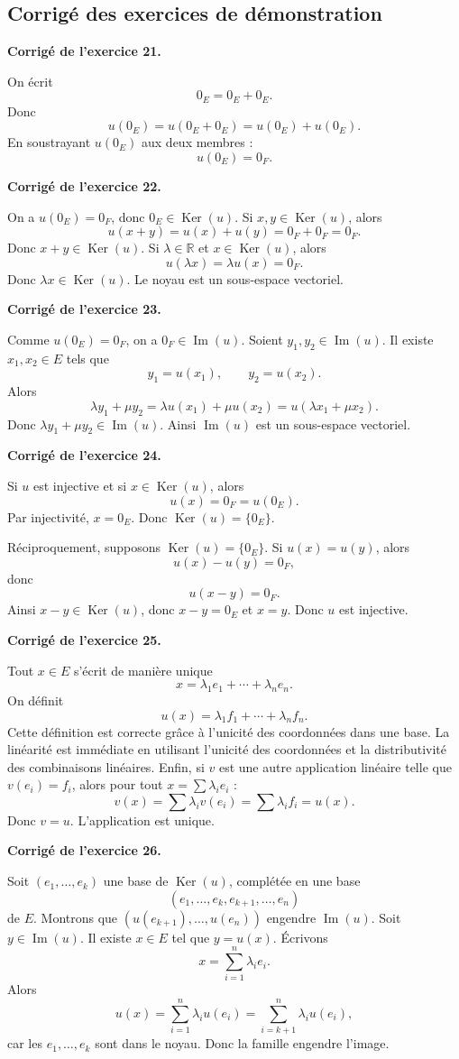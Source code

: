 \documentclass[11pt,a4paper]{article}
\newcommand{\corr}[1]{
    \vspace{0.35cm}
    \noindent\textbf{\textcolor{blue!60!black}{Corrigé de l'exercice #1.}}
    \par
}
\newcommand{\Ker}{\operatorname{Ker}}
\newcommand{\Img}{\operatorname{Im}}
\begin{document}
\subsection{Corrigé des exercices de démonstration}

\corr{21}
On écrit
\[
0_E=0_E+0_E.
\]
Donc
\[
u(0_E)=u(0_E+0_E)=u(0_E)+u(0_E).
\]
En soustrayant $u(0_E)$ aux deux membres :
\[
u(0_E)=0_F.
\]

\corr{22}
On a $u(0_E)=0_F$, donc $0_E\in\Ker(u)$.
Si $x,y\in\Ker(u)$, alors
\[
u(x+y)=u(x)+u(y)=0_F+0_F=0_F.
\]
Donc $x+y\in\Ker(u)$.
Si $\lambda\in\mathbb{R}$ et $x\in\Ker(u)$, alors
\[
u(\lambda x)=\lambda u(x)=0_F.
\]
Donc $\lambda x\in\Ker(u)$. Le noyau est un sous-espace vectoriel.

\corr{23}
Comme $u(0_E)=0_F$, on a $0_F\in\Img(u)$.
Soient $y_1,y_2\in\Img(u)$. Il existe $x_1,x_2\in E$ tels que
\[
y_1=u(x_1),\qquad y_2=u(x_2).
\]
Alors
\[
\lambda y_1+\mu y_2=\lambda u(x_1)+\mu u(x_2)=u(\lambda x_1+\mu x_2).
\]
Donc $\lambda y_1+\mu y_2\in\Img(u)$. Ainsi $\Img(u)$ est un sous-espace vectoriel.

\corr{24}
Si $u$ est injective et si $x\in\Ker(u)$, alors
\[
u(x)=0_F=u(0_E).
\]
Par injectivité, $x=0_E$. Donc $\Ker(u)=\{0_E\}$.

Réciproquement, supposons $\Ker(u)=\{0_E\}$. Si $u(x)=u(y)$, alors
\[
u(x)-u(y)=0_F,
\]
donc
\[
u(x-y)=0_F.
\]
Ainsi $x-y\in\Ker(u)$, donc $x-y=0_E$ et $x=y$. Donc $u$ est injective.

\corr{25}
Tout $x\in E$ s'écrit de manière unique
\[
x=\lambda_1e_1+\cdots+\lambda_ne_n.
\]
On définit
\[
u(x)=\lambda_1f_1+\cdots+\lambda_nf_n.
\]
Cette définition est correcte grâce à l'unicité des coordonnées dans une base. La linéarité est immédiate en utilisant l'unicité des coordonnées et la distributivité des combinaisons linéaires.
Enfin, si $v$ est une autre application linéaire telle que $v(e_i)=f_i$, alors pour tout $x=\sum \lambda_i e_i$ :
\[
v(x)=\sum \lambda_i v(e_i)=\sum\lambda_i f_i=u(x).
\]
Donc $v=u$. L'application est unique.

\corr{26}
Soit $(e_1,\dots,e_k)$ une base de $\Ker(u)$, complétée en une base
\[
(e_1,\dots,e_k,e_{k+1},\dots,e_n)
\]
de $E$.
Montrons que $(u(e_{k+1}),\dots,u(e_n))$ engendre $\Img(u)$. Soit $y\in\Img(u)$. Il existe $x\in E$ tel que $y=u(x)$. Écrivons
\[
x=\sum_{i=1}^n \lambda_i e_i.
\]
Alors
\[
u(x)=\sum_{i=1}^n\lambda_i u(e_i)=\sum_{i=k+1}^n\lambda_i u(e_i),
\]
car les $e_1,\dots,e_k$ sont dans le noyau. Donc la famille engendre l'image.
\end{document}
